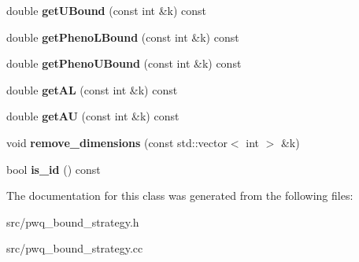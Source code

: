 \begin{DoxyCompactItemize}
\item 
\hypertarget{classlibcmaes_1_1pwqBoundStrategy_a457a0e05a886af1df39f002c1fa85995}{double {\bfseries get\+U\+Bound} (const int \&k) const }\label{classlibcmaes_1_1pwqBoundStrategy_a457a0e05a886af1df39f002c1fa85995}

\item 
\hypertarget{classlibcmaes_1_1pwqBoundStrategy_ae73e1b4b2a5b3790df35d2b9d2e6f79d}{double {\bfseries get\+Pheno\+L\+Bound} (const int \&k) const }\label{classlibcmaes_1_1pwqBoundStrategy_ae73e1b4b2a5b3790df35d2b9d2e6f79d}

\item 
\hypertarget{classlibcmaes_1_1pwqBoundStrategy_a06ec87ccab430f70440efdb6721d807d}{double {\bfseries get\+Pheno\+U\+Bound} (const int \&k) const }\label{classlibcmaes_1_1pwqBoundStrategy_a06ec87ccab430f70440efdb6721d807d}

\item 
\hypertarget{classlibcmaes_1_1pwqBoundStrategy_abac7ef27875331f619b30de7c274a250}{double {\bfseries get\+A\+L} (const int \&k) const }\label{classlibcmaes_1_1pwqBoundStrategy_abac7ef27875331f619b30de7c274a250}

\item 
\hypertarget{classlibcmaes_1_1pwqBoundStrategy_a16ff65bb05a68090f0ecf8df59d71b09}{double {\bfseries get\+A\+U} (const int \&k) const }\label{classlibcmaes_1_1pwqBoundStrategy_a16ff65bb05a68090f0ecf8df59d71b09}

\item 
\hypertarget{classlibcmaes_1_1pwqBoundStrategy_a157d5a8901cfd0615732bac18af5ef23}{void {\bfseries remove\+\_\+dimensions} (const std\+::vector$<$ int $>$ \&k)}\label{classlibcmaes_1_1pwqBoundStrategy_a157d5a8901cfd0615732bac18af5ef23}

\item 
\hypertarget{classlibcmaes_1_1pwqBoundStrategy_ac3f729981c7f2f4161f966d6c82dc051}{bool {\bfseries is\+\_\+id} () const }\label{classlibcmaes_1_1pwqBoundStrategy_ac3f729981c7f2f4161f966d6c82dc051}

\end{DoxyCompactItemize}


The documentation for this class was generated from the following files\+:\begin{DoxyCompactItemize}
\item 
src/pwq\+\_\+bound\+\_\+strategy.\+h\item 
src/pwq\+\_\+bound\+\_\+strategy.\+cc\end{DoxyCompactItemize}
